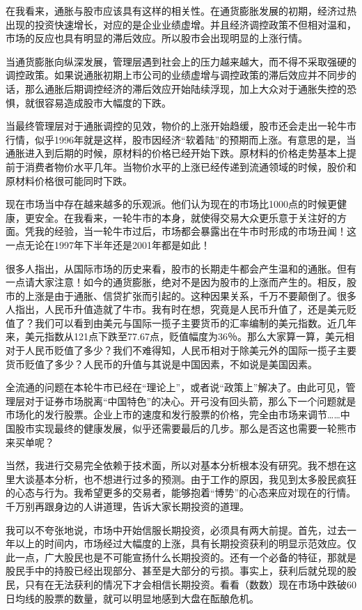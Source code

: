 在我看来，通胀与股市应该具有这样的相关性。在通货膨胀发展的初期，经济过热出现的投资快速增长，对应的是企业业绩虚增。并且经济调控政策不但相对温和，市场的反应也具有明显的滞后效应。所以股市会出现明显的上涨行情。

当通货膨胀向纵深发展，管理层遇到社会上的压力越来越大，而不得不采取强硬的调控政策。如果说通胀初期上市公司的业绩虚增与调控政策的滞后效应并不同步的话，那么通胀后期调控经济的滞后效应开始陆续浮现，加上大众对于通胀失控的恐惧，就很容易造成股市大幅度的下跌。

当最终管理层对于通胀调控的见效，物价的上涨开始趋缓，股市还会走出一轮牛市行情，似乎1996年就是这样，股市因经济“软着陆”的预期而上涨。有意思的是，当通胀进入到后期的时候，原材料的价格已经开始下跌。原材料的价格走势基本上提前于消费者物价水平几年。当物价水平的上涨已经传递到流通领域的时候，股价和原材料价格很可能同时下跌。

现在市场当中存在越来越多的乐观派。他们认为现在的市场比1000点的时候更健康，更安全。在我看来，一轮牛市的本身，就使得交易大众更乐意于关注好的方面。凭我的经验，当一轮牛市过后，市场都会暴露出在牛市时形成的市场丑闻！这一点无论在1997年下半年还是2001年都是如此！

很多人指出，从国际市场的历史来看，股市的长期走牛都会产生温和的通胀。但有一点请大家注意！如今的通货膨胀，绝对不是因为股市的上涨而产生的。相反，股市的上涨是由于通胀、信贷扩张而引起的。这种因果关系，千万不要颠倒了。很多人指出，人民币升值造就了牛市。我有时在想，究竟是人民币升值了，还是美元贬值了？我们可以看到由美元与国际一揽子主要货币的汇率编制的美元指数。近几年来，美元指数从121点下跌至77.67点，贬值幅度为36％。那么大家算一算，美元相对于人民币贬值了多少？我们不难得知，人民币相对于除美元外的国际一揽子主要货币贬值了多少？人民币的升值与其说是中国因素，不如说是美国因素。

全流通的问题在本轮牛市已经在“理论上”，或者说“政策上”解决了。由此可见，管理层对于证券市场脱离“中国特色”的决心。开弓没有回头箭，那么下一个问题就是市场化的发行股票。企业上市的速度和发行股票的价格，完全由市场来调节……中国股市实现最终的健康发展，似乎还需要最后的几步。那么是否这也需要一轮熊市来买单呢？

当然，我进行交易完全依赖于技术面，所以对基本分析根本没有研究。我不想在这里大谈基本分析，也不想进行过多的预测。由于工作的原因，我见到太多股民疯狂的心态与行为。我希望更多的交易者，能够抱着“博势”的心态来应对现在的行情。千万别再跟身边的人讲道理，告诉大家长期投资的道理。

我可以不夸张地说，市场中开始信服长期投资，必须具有两大前提。首先，过去一年以上的时间内，市场经过大幅度的上涨，具有长期投资获利的明显示范效应。仅此一点，广大股民也是不可能宣扬什么长期投资的。还有一个必备的特征，那就是股民手中的持股已经出现部分、甚至是大部分的亏损。事实上，获利后就兑现的股民，只有在无法获利的情况下才会相信长期投资。看看（数数）现在市场中跌破60日均线的股票的数量，就可以明显地感到大盘在酝酿危机。

